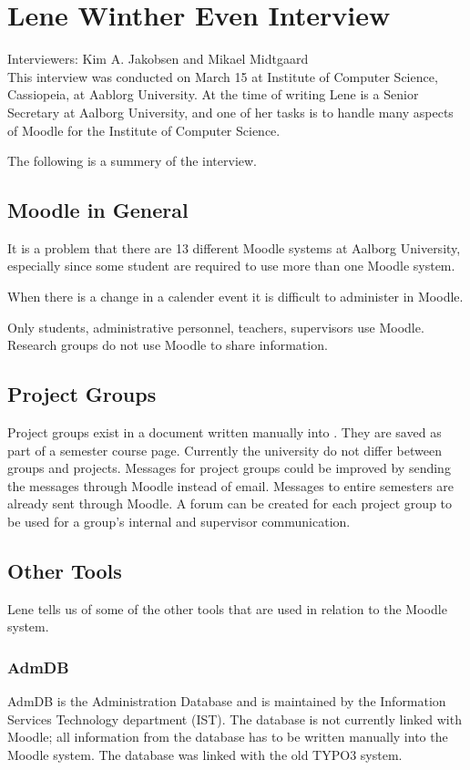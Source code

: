 \section{Lene Winther Even Interview}
\label{sec:lene}
Interviewers: Kim A. Jakobsen and Mikael Midtgaard\\


This interview was conducted on March 15\ths{} at Institute of Computer Science, Cassiopeia, at Aablorg University.
At the time of writing Lene is a Senior Secretary at Aalborg University, and one of her tasks is to handle many aspects of Moodle for the Institute of Computer Science.

The following is a summery of the interview.

\subsection*{Moodle in General}
It is a problem that there are 13 different Moodle systems at Aalborg University, especially since some student are required to use more than one Moodle system.

When there is a change in a calender event it is difficult to administer in Moodle.

Only students, administrative personnel, teachers, supervisors use Moodle.
Research groups do not use Moodle to share information.

\subsection*{Project Groups}
Project groups exist in a document written manually into \moodle{}.
They are saved as part of a semester course page.
Currently the university do not differ between groups and projects.
Messages for project groups could be improved by sending the messages through Moodle instead of email.
Messages to entire semesters are already sent through Moodle.
A forum can be created for each project group to be used for a group's internal and supervisor communication.

\subsection*{Other Tools}
Lene tells us of some of the other tools that are used in relation to the Moodle system.

\subsubsection*{AdmDB}
AdmDB is the Administration Database and is maintained by the Information Services Technology department (IST).
The database is not currently linked with Moodle; all information from the database has to be written manually into the Moodle system.
The database was linked with the old TYPO3 system.

